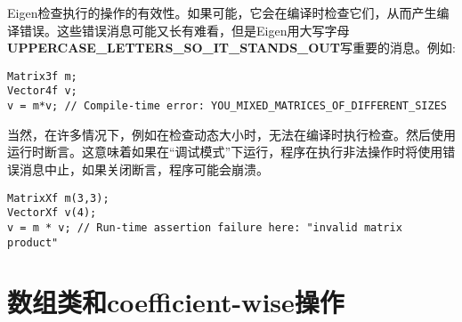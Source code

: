 Eigen检查执行的操作的有效性。如果可能，它会在编译时检查它们，从而产生编译错误。这些错误消息可能又长有难看，但是Eigen用大写字母 \textbf{UPPERCASE\_LETTERS\_SO\_IT\_STANDS\_OUT}写重要的消息。例如:
\begin{lstlisting}[style=Cpp]
Matrix3f m;
Vector4f v;
v = m*v; // Compile-time error: YOU_MIXED_MATRICES_OF_DIFFERENT_SIZES
\end{lstlisting}

当然，在许多情况下，例如在检查动态大小时，无法在编译时执行检查。然后使用运行时断言。这意味着如果在“调试模式”下运行，程序在执行非法操作时将使用错误消息中止，如果关闭断言，程序可能会崩溃。

\begin{lstlisting}[style=Cpp]
MatrixXf m(3,3);
VectorXf v(4);
v = m * v; // Run-time assertion failure here: "invalid matrix product"
\end{lstlisting}

\section{数组类和coefficient-wise操作}

